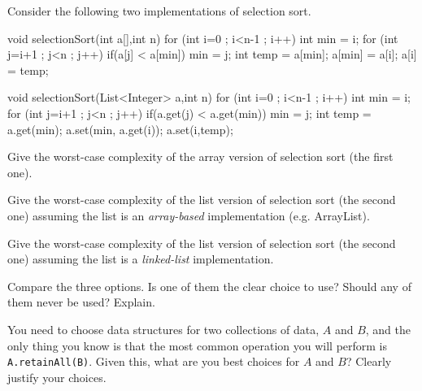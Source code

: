 \begin{pro}
Consider the following two implementations of selection sort.
\begin{code}
void selectionSort(int a[],int n) {
    for (int i=0 ; i<n-1 ; i++) {
        int min = i;
        for (int j=i+1 ; j<n ; j++) {
            if(a[j] < a[min]) 
                min = j;
        }
        int temp = a[min];
        a[min] = a[i];
        a[i] = temp;
    }
}
\end{code}

\begin{code}
void selectionSort(List<Integer> a,int n) {
    for (int i=0 ; i<n-1 ; i++) {
        int min = i;
        for (int j=i+1 ; j<n ; j++) {
            if(a.get(j) < a.get(min)) 
                min = j;
        }
        int temp = a.get(min);
        a.set(min, a.get(i));
        a.set(i,temp);
    }
}
\end{code}
\begin{lenum}
\item
Give the worst-case complexity of the array version of selection sort (the first one).
\item
Give the worst-case complexity of the list version of selection sort (the second one) assuming the list is an {\em array-based} implementation (e.g. ArrayList).
\item
Give the worst-case complexity of the list version of selection sort (the second one) assuming the list is a {\em linked-list} implementation.
\item
Compare the three options.  Is one of them the clear choice to use?  Should any of them never be used? Explain.
\end{lenum}
\end{pro}


\begin{pro}
You need to choose data structures for two collections of data, $A$ and $B$, 
and the only thing you know is that the most common operation you will perform is
\verb+A.retainAll(B)+.
Given this, what are you best choices for $A$ and $B$?  Clearly justify your choices.
\end{pro}

